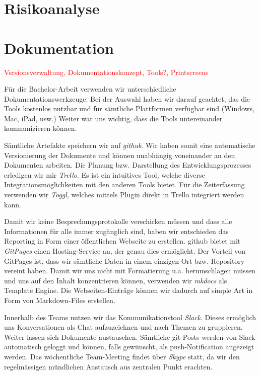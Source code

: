 \documentclass[a4paper,ngerman, 11pt, pagesize]{report}
\newcommand\Diskussionspunkt[1]{\textcolor{red}{#1}}
\begin{document}
\section{Risikoanalyse}
   


\section{Dokumentation}
\Diskussionspunkt{Versionsverwaltung, Dokumentationskonzept, Tools?, Printscreens}

Für die Bachelor-Arbeit verwenden wir unterschiedliche Dokumentationswerkzeuge. Bei der Auswahl haben wir darauf geachtet, das die Tools kostenlos nutzbar und für sämtliche Plattformen verfügbar sind (Windows, Mac, iPad, usw.) Weiter war uns wichtig, dass die Tools untereinander kommunizieren können. 

Sämtliche Artefakte speichern wir auf \textit{github}. Wir haben somit eine automatische Versionierung der Dokumente und können unabhängig voneinander an den Dokumenten arbeiten. Die Planung bzw. Darstellung des Entwicklungsprozesses erledigen wir mir \textit{Trello}. Es ist ein intuitives Tool, welche diverse Integrationsmöglichkeiten mit den anderen Tools bietet. Für die Zeiterfassung verwenden wir \textit{Toggl}, welches mittels Plugin direkt in Trello integriert werden kann.

Damit wir keine Besprechungsprotokolle verschicken müssen und dass alle Informationen für alle immer zugänglich sind, haben wir entschieden das Reporting in Form einer öffentlichen Webseite zu erstellen. github bietet mit \textit{GitPages} einen Hosting-Service an, der genau dies ermöglicht. Der Vorteil von GitPages ist, dass wir sämtliche Daten in einem einzigen Ort bzw. Repository vereint haben. Damit wir uns nicht mit Formatierung u.a. herumschlagen müssen und uns auf den Inhalt konzentrieren können, verwenden wir \textit{mkdocs} als Template Engine. Die Webseiten-Einträge können wir dadurch auf simple Art in Form von Markdown-Files erstellen.

Innerhalb des Teams nutzen wir das Kommunikationstool \textit{Slack}. Dieses ermöglich uns Konversationen als Chat aufzuzeichnen und nach Themen zu gruppieren. Weiter lassen sich Dokumente austauschen. Sämtliche git-Posts werden von Slack automatisch geloggt und können, falls gewünscht, als push-Notification angezeigt werden.
Das wöchentliche Team-Meeting findet über \textit{Skype} statt, da wir den regelmässigen mündlichen Austausch aus zentralen Punkt erachten.
\end{document}
